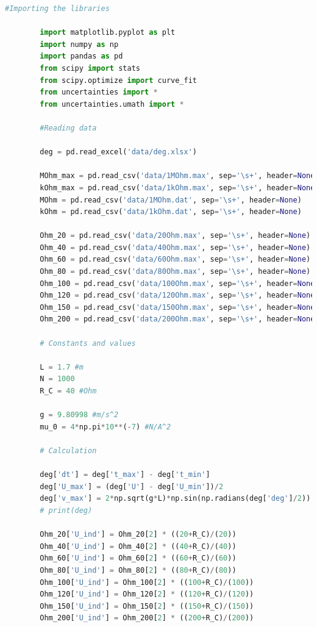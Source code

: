 \documentclass[a4paper,11pt]{article}
\begin{document}
    \begin{lstlisting}[language=Python, basicstyle=\tiny, breaklines=true, postbreak=\mbox{\textbackslashspace}]
        #Importing the libraries

        import matplotlib.pyplot as plt
        import numpy as np
        import pandas as pd
        from scipy import stats
        from scipy.optimize import curve_fit
        from uncertainties import *
        from uncertainties.umath import *

        #Reading data

        deg = pd.read_excel('data/deg.xlsx')

        MOhm_max = pd.read_csv('data/1MOhm.max', sep='\s+', header=None)
        kOhm_max = pd.read_csv('data/1kOhm.max', sep='\s+', header=None)
        MOhm = pd.read_csv('data/1MOhm.dat', sep='\s+', header=None)
        kOhm = pd.read_csv('data/1kOhm.dat', sep='\s+', header=None)

        Ohm_20 = pd.read_csv('data/20Ohm.max', sep='\s+', header=None)
        Ohm_40 = pd.read_csv('data/40Ohm.max', sep='\s+', header=None)
        Ohm_60 = pd.read_csv('data/60Ohm.max', sep='\s+', header=None)
        Ohm_80 = pd.read_csv('data/80Ohm.max', sep='\s+', header=None)
        Ohm_100 = pd.read_csv('data/100Ohm.max', sep='\s+', header=None)
        Ohm_120 = pd.read_csv('data/120Ohm.max', sep='\s+', header=None)
        Ohm_150 = pd.read_csv('data/150Ohm.max', sep='\s+', header=None)
        Ohm_200 = pd.read_csv('data/200Ohm.max', sep='\s+', header=None)

        # Constants and values

        L = 1.7 #m
        N = 1000 
        R_C = 40 #Ohm

        g = 9.80998 #m/s^2
        mu_0 = 4*np.pi*10**(-7) #N/A^2

        # Calculation 

        deg['dt'] = deg['t_max'] - deg['t_min']
        deg['U_max'] = (deg['U'] - deg['U_min'])/2
        deg['v_max'] = 2*np.sqrt(g*L)*np.sin(np.radians(deg['deg']/2))
        # print(deg)

        Ohm_20['U_ind'] = Ohm_20[2] * ((20+R_C)/(20))
        Ohm_40['U_ind'] = Ohm_40[2] * ((40+R_C)/(40))
        Ohm_60['U_ind'] = Ohm_60[2] * ((60+R_C)/(60))
        Ohm_80['U_ind'] = Ohm_80[2] * ((80+R_C)/(80))
        Ohm_100['U_ind'] = Ohm_100[2] * ((100+R_C)/(100))
        Ohm_120['U_ind'] = Ohm_120[2] * ((120+R_C)/(120))
        Ohm_150['U_ind'] = Ohm_150[2] * ((150+R_C)/(150))
        Ohm_200['U_ind'] = Ohm_200[2] * ((200+R_C)/(200))


\end{lstlisting}
\end{document}
